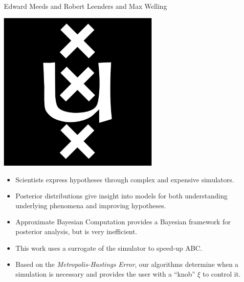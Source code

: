 \documentclass[portrait,a0b,final,a4resizeable]{include/a0poster}
\begin{document}
\begin{poster}
\begin{center}
\begin{pcolumn}{0.99}
{\begin{minipage}[c][9cm][c]{0.76\textwidth}
\begin{center}
    {\huge\sffamily \Huge Edward Meeds and Robert Leenders and  Max Welling\\[7.5mm]
    }
  \end{center}
\end{minipage}
%
%
\begin{minipage}[c]{\logowidth}
  \begin{flushright}
    \includegraphics[width=8cm]{badges/500px-University_of_Amsterdam_logo.png}
  \end{flushright}
\end{minipage}

}
\end{pcolumn}
\end{center}


\large




\begin{multicols}{3}





\begin{itemize}
	\item Scientists express hypotheses through complex and expensive simulators.
	\item Posterior distributions give insight into models for both understanding underlying phenomena and improving hypotheses.
	\item Approximate Bayesian Computation provides a Bayesian framework for posterior analysis, but is very inefficient.
  \item This work uses a surrogate of the simulator to speed-up ABC.
  \item Based on the \emph{Metropolis-Hastings Error}, our algorithms determine when a simulation is necessary and provides the user with a ``knob'' $\xi$ to control it.
\end{itemize}


\end{multicols}
\end{poster}
\end{document}

